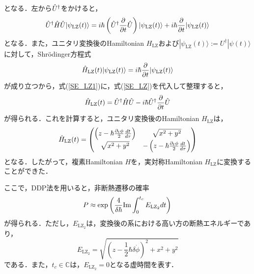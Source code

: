 \documentclass[a4paper, titlepage]{jsreport}
\begin{document}
となる．左から$\Hat{U}^{\dagger}$をかけると，
\begin{equation}
   \Hat{U}^{\dagger} \Hat{H} \Hat{U} |\psi_{\mathrm{LZ}}(t) \rangle = i \hbar \left(\Hat{U}^{\dagger} \frac{\partial}{\partial t} \Hat{U} \right)|\psi_{\mathrm{LZ}}(t) \rangle + i \hbar \frac{\partial}{\partial t} |\psi_{\mathrm{LZ}}(t) \rangle \label{SE_LZ1}
\end{equation}
となる．また，ユニタリ変換後のHamiltonian $H_{\mathrm{LZ}}$および$|\psi_{\mathrm{LZ}}(t) \rangle := U^{\dagger} |\psi(t) \rangle$に対して，Shr\"{o}dinger方程式
\begin{equation}
   \Hat{H}_{\mathrm{LZ}}(t) |\psi_{\mathrm{LZ}}(t) \rangle = i\hbar \frac{\partial}{\partial t} |\psi_{\mathrm{LZ}}(t) \rangle  \label{SE_LZ}
\end{equation} 
が成り立つから，式(\ref{SE_LZ1})に，式(\ref{SE_LZ})を代入して整理すると，
\begin{equation}
  \Hat{H}_{\mathrm{LZ}}(t)  = \Hat{U}^{\dagger} \Hat{H} \Hat{U} - i\hbar \Hat{U}^{\dagger} \frac{\partial}{\partial t} \Hat{U} 
\end{equation}
が得られる．これを計算すると，ユニタリ変換後のHamiltonian $H_{\mathrm{LZ}}$は，
\begin{equation}
    \Hat{H}_{\mathrm{LZ}}(t) =
    \begin{pmatrix}
      \left(z - \hbar \frac{\partial_t \phi}{2} \frac{dt}{d\tau}\right) & \sqrt{x^2+y^2}\\
      \sqrt{x^2+y^2} & -\left(z - \hbar \frac{\partial_t \phi}{2} \frac{dt}{d\tau}\right)
    \end{pmatrix}
\end{equation}
となる．したがって，複素Hamiltonian $H$を，実対称Hamiltonian $H_{\mathrm{LZ}}$に変換することができた．


ここで，DDP法を用いると，非断熱遷移の確率
\begin{equation}
  P
  \approx \exp \left(\frac{4}{\delta \hbar} \mathrm{Im} \int_0^{t_c} E_{\mathrm{LZ}_2} dt \right) \label{P_nt}\\
\end{equation}
が得られる．ただし，$E_{\mathrm{LZ}_2}$は，変換後の系における高い方の断熱エネルギーであり，
\begin{equation}
  E_{\mathrm{LZ}_2} 
  = \sqrt{\left(z - \frac{1}{2} \hbar \delta \Dot{\phi}\right)^2 + x^2+y^2} \label{E_LZ}
\end{equation}
である．また，$t_c \in \mathbb{C}$は，$E_{\mathrm{LZ}_2} = 0$となる虚時間を表す．
\end{document}
